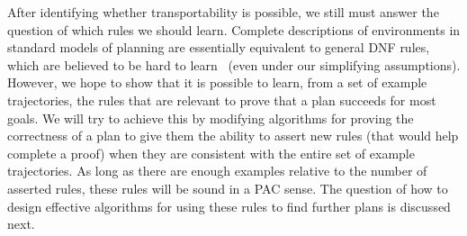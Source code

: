 \documentclass[12pt]{article}
\newcommand{\note}[1]{\textbf{\textit{#1}}}
\begin{document}
After identifying whether transportability is possible, we still must answer the question of which rules we should  learn. Complete descriptions of environments in standard models of planning are essentially equivalent to general DNF rules, which are believed to be hard to learn~\cite{daniely2016dnf} (even under our simplifying assumptions). However, we hope to show that it is possible to learn, from a set of example trajectories, the rules that are relevant to prove that a plan succeeds for most goals. We will try to achieve this by modifying algorithms for proving the correctness of a plan to give them the ability to assert new rules (that would help complete a proof) when they are consistent with the entire set of example trajectories. As long as there are enough examples relative to the number of asserted rules, these rules will be sound in a PAC sense. The question of how to design effective algorithms for using these rules to find further plans is discussed next.

\end{document}
